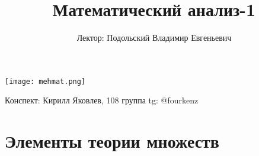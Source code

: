 \documentclass[a4paper, 12pt]{article}
\title{\textbf{Математический анализ-1}}
\author{Лектор: Подольский Владимир Евгеньевич}
\newcommand\tab[1][.5cm]{\hspace*{#1}}
\theoremstyle{definition}
\begin{document}
    \fontsize{14pt}{20pt}\selectfont
    \maketitle
    \vspace{0.3cm}
    \begin{center}
        \texttt{[image: mehmat.png]}
    \end{center}
    \vspace{1.5cm}
    \begin{center}
        Конспект: Кирилл Яковлев, 108 группа \tab[5.5cm] tg: @fourkenz
    \end{center}
    \newpage
    \tableofcontents
    \fontsize{14pt}{20pt}\selectfont
    \newpage

    \section{Элементы теории множеств}
\end{document}
